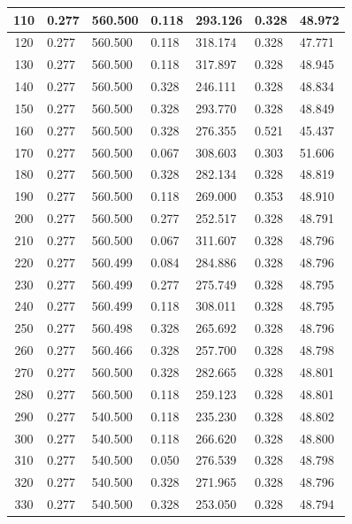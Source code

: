 \begin{longtable}{|c|l|l|l|l|l|l|}
        110 & 0.277 & 560.500 & 0.118 & 293.126 & 0.328 & 48.972 \\ \hline
        120 & 0.277 & 560.500 & 0.118 & 318.174 & 0.328 & 47.771 \\ \hline
        130 & 0.277 & 560.500 & 0.118 & 317.897 & 0.328 & 48.945 \\ \hline
        140 & 0.277 & 560.500 & 0.328 & 246.111 & 0.328 & 48.834 \\ \hline
        150 & 0.277 & 560.500 & 0.328 & 293.770 & 0.328 & 48.849 \\ \hline
        160 & 0.277 & 560.500 & 0.328 & 276.355 & 0.521 & 45.437 \\ \hline
        170 & 0.277 & 560.500 & 0.067 & 308.603 & 0.303 & 51.606 \\ \hline
        180 & 0.277 & 560.500 & 0.328 & 282.134 & 0.328 & 48.819 \\ \hline
        190 & 0.277 & 560.500 & 0.118 & 269.000 & 0.353 & 48.910 \\ \hline
        200 & 0.277 & 560.500 & 0.277 & 252.517 & 0.328 & 48.791 \\ \hline
        210 & 0.277 & 560.500 & 0.067 & 311.607 & 0.328 & 48.796 \\ \hline
        220 & 0.277 & 560.499 & 0.084 & 284.886 & 0.328 & 48.796 \\ \hline
        230 & 0.277 & 560.499 & 0.277 & 275.749 & 0.328 & 48.795 \\ \hline
        240 & 0.277 & 560.499 & 0.118 & 308.011 & 0.328 & 48.795 \\ \hline
        250 & 0.277 & 560.498 & 0.328 & 265.692 & 0.328 & 48.796 \\ \hline
        260 & 0.277 & 560.466 & 0.328 & 257.700 & 0.328 & 48.798 \\ \hline
        270 & 0.277 & 560.500 & 0.328 & 282.665 & 0.328 & 48.801 \\ \hline
        280 & 0.277 & 560.500 & 0.118 & 259.123 & 0.328 & 48.801 \\ \hline
        290 & 0.277 & 540.500 & 0.118 & 235.230 & 0.328 & 48.802 \\ \hline
        300 & 0.277 & 540.500 & 0.118 & 266.620 & 0.328 & 48.800 \\ \hline
        310 & 0.277 & 540.500 & 0.050 & 276.539 & 0.328 & 48.798 \\ \hline
        320 & 0.277 & 540.500 & 0.328 & 271.965 & 0.328 & 48.796 \\ \hline
        330 & 0.277 & 540.500 & 0.328 & 253.050 & 0.328 & 48.794 \\ \hline

\end{longtable}
